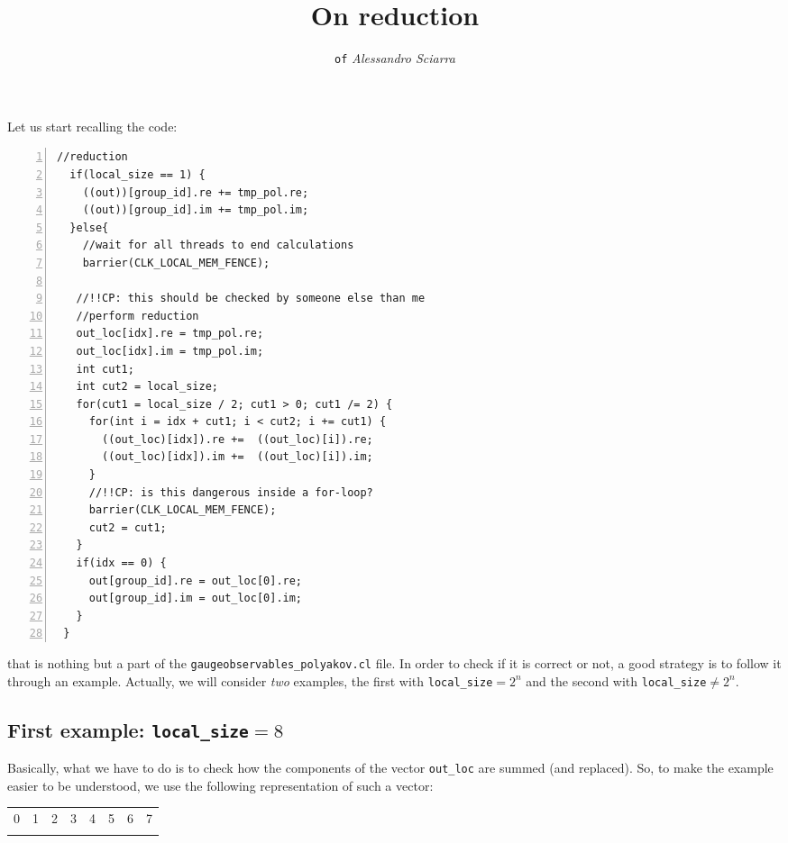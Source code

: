 \documentclass[a4paper,11pt]{article}
\title{\vspace*{-1.5cm}\huge\textbf {On reduction}\vspace{-0.5cm}}
\author{\small \texttt{of} \emph{Alessandro Sciarra}}
\date{}
\begin{document}
\maketitle

\noindent Let us start recalling the code:
\begin{Verbatim}[gobble=0,numbers=left,numbersep=12pt,stepnumber=1,fontsize=\small]
  //reduction
  if(local_size == 1) {
    ((out))[group_id].re += tmp_pol.re;
    ((out))[group_id].im += tmp_pol.im;
  }else{
    //wait for all threads to end calculations
    barrier(CLK_LOCAL_MEM_FENCE);

   //!!CP: this should be checked by someone else than me
   //perform reduction
   out_loc[idx].re = tmp_pol.re;
   out_loc[idx].im = tmp_pol.im;
   int cut1;
   int cut2 = local_size;
   for(cut1 = local_size / 2; cut1 > 0; cut1 /= 2) {
     for(int i = idx + cut1; i < cut2; i += cut1) {
       ((out_loc)[idx]).re +=  ((out_loc)[i]).re;
       ((out_loc)[idx]).im +=  ((out_loc)[i]).im;
     }
     //!!CP: is this dangerous inside a for-loop?
     barrier(CLK_LOCAL_MEM_FENCE);
     cut2 = cut1;
   }
   if(idx == 0) {
     out[group_id].re = out_loc[0].re;
     out[group_id].im = out_loc[0].im;
   }
 }
\end{Verbatim}
that is nothing but a part of the \texttt{gaugeobservables\_polyakov.cl} file. In order to check if it is correct or not,
a good strategy is to follow it through an example. Actually, we will consider \emph{two} examples, the first with
\texttt{local\_size}$=2^{n}$ and the second with \texttt{local\_size}$\neq2^{n}$.

\subsection*{First example: \texttt{local\_size}$=8$ }

Basically, what we have to do is to check how the components of the vector \texttt{out\_loc} are
summed (and replaced). So, to make the example easier to be understood, we use the following representation of such
a vector:

\begin{center}
\begin{tabular}{!{\vrule width 1.5pt}P*{7}{|P}!{\vrule width 1.5pt}}
0 & 1 & 2 & 3 & 4 & 5 & 6 & 7 \tabularnewline
{}
\end{tabular}
\end{center}
\end{document}
